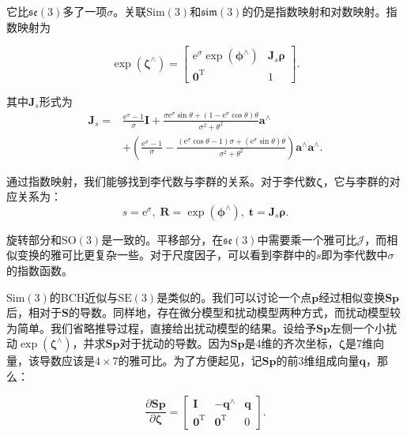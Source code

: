 它比$\mathfrak{se}(3)$多了一项$\sigma$。关联$\mathrm{Sim}(3)$和$\mathfrak{sim}(3)$的仍是指数映射和对数映射。指数映射为

\begin{equation}
\exp \left( {{ \bm{\zeta} ^ \wedge }} \right) = \left[ {\begin{array}{*{20}{c}}
	{{\mathrm{e}^\sigma }\exp \left( {{ \bm{\phi} ^ \wedge }} \right)}&{ \bm{J}_s \bm{\rho} }\\
	{{\bm{0}^\mathrm{T}}}&1
	\end{array}} \right].
\end{equation}

其中$\bm{J}_s$形式为
\begin{align*}
{ \bm{J}_s} =& \frac{{{\mathrm{e}^\sigma } - 1}}{\sigma } \bm{I} + \frac{ \sigma {{\mathrm{e}^\sigma }\sin \theta  + \left( {1 - {\mathrm{e}^\sigma }\cos \theta } \right)\theta }}{{{\sigma ^2} + {\theta ^2}}}{\bm{a}^ \wedge }\\
 &+ \left( {\frac{{{\mathrm{e}^\sigma } - 1}}{\sigma } - \frac{{\left( {{\mathrm{e}^\sigma }\cos \theta  - 1} \right)\sigma  + ({\mathrm{e}^\sigma }\sin \theta )\theta }}{{{\sigma ^2} + {\theta ^2}}}} \right){\bm{a}^ \wedge }{\bm{a}^ \wedge }.
\end{align*}

通过指数映射，我们能够找到李代数与李群的关系。对于李代数$\bm{\zeta}$，它与李群的对应关系为：
\begin{equation}
s=\mathrm{e}^\sigma, \; \bm{R} = \exp( \bm{\phi} ^\wedge), \; \bm{t} = \bm{J}_s \bm{\rho}.
\end{equation}

旋转部分和$\mathrm{SO}(3)$是一致的。平移部分，在$\mathfrak{se}(3)$中需要乘一个雅可比$\bm{\mathcal{J}}$，而相似变换的雅可比更复杂一些。对于尺度因子，可以看到李群中的$s$即为李代数中$\sigma$的指数函数。

$\mathrm{Sim}(3)$的BCH近似与$\mathrm{SE}(3)$是类似的。我们可以讨论一个点$\bm{p}$经过相似变换$\bm{S} \bm{p}$后，相对于$\bm{S}$的导数。同样地，存在微分模型和扰动模型两种方式，而扰动模型较为简单。我们省略推导过程，直接给出扰动模型的结果。设给予$\bm{S} \bm{p}$左侧一个小扰动$\exp( \bm{\zeta} ^\wedge )$，并求$\bm{S} \bm{p}$对于扰动的导数。因为$\bm{S} \bm{p}$是4维的齐次坐标，$\bm{\zeta}$是7维向量，该导数应该是$4 \times 7$的雅可比。为了方便起见，记$\bm{Sp}$的前3维组成向量$\bm{q}$，那么：

\begin{equation}
\frac{{\partial \bm{Sp}}}{{\partial \bm{\zeta} }} = \left[ {\begin{array}{*{20}{c}}
	\bm{I} &{ - {\bm{q}^ \wedge }}& \bm{q} \\
	{{\bm{0}^\mathrm{T}}} & {{ \bm{0}^\mathrm{T}}}&0
	\end{array}} \right].
\end{equation}

